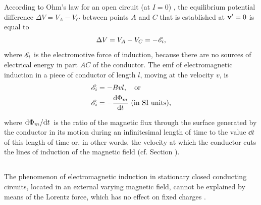 According to Ohm's law for an open circuit (at $I = 0$) , the equilibrium potential difference $\Delta V = V_{A} - V_{C}$ between points $A$ and $C$ that is established at $\vb{v}' = 0$ is equal to
\begin{equation*}%
\Delta V = V_{A} - V_{C} = - \emf_{i},
\end{equation*}
where $\mathscr{E}_{i}$ is the electromotive force of induction, because there are no sources of electrical energy in part $AC$ of the conductor. The emf of electromagnetic induction in a piece of conductor of length $l$, moving at the velocity $v$, is
\begin{align*}%
\emf_{i} & = - Bvl, \qor \\
\emf_{i} & = - \dv{\Phi_{m}}{t} \,\, \text{(in SI units)}, 
\end{align*}

where $\dv*{\Phi_{m}}{t}$ is the ratio of the magnetic flux through the surface generated by the conductor in its motion during an infinitesimal length of time to the value $\dd t$ of this length of time or, in other words, the velocity at which the conductor cuts the lines of induction of the magnetic field (cf. Section ). 

\subsection{}\label{25.1.6} The phenomenon of electromagnetic induction in stationary closed conducting circuits, located in an external varying magnetic field, cannot be explained by means of the Lorentz force, which has no effect on fixed charges .

